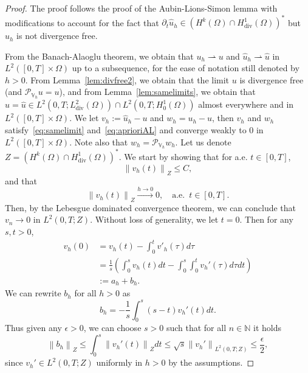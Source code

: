 \documentclass[10pt,a4paper]{amsart}
\newcommand\norm[1]{\left\lVert#1\right\rVert}
\newcommand{\Div}{\operatorname{div}}
\newcommand{\N}{\mathbb{N}}
\newcommand{\PVh}{\mathcal{P}_{\Vh}}
\newcommand{\Vh}{\mathbb{V}_h}
\newcommand{\dom}{\Omega}
\newcommand{\hu}{\widehat{u}}
\newcommand{\weak}{\rightharpoonup}
\begin{document}
\begin{proof}
	The proof follows the proof of the Aubin-Lions-Simon lemma with modifications to account for the fact that $\partial_t \hu_h\in (H^k(\dom)\cap H^1_{\Div}(\dom))^*$ but $\hu_h$ is not divergence free.
	
	From the Banach-Alaoglu theorem, we obtain that $u_h\weak u$ and $\hu_h\weak \hu$ in $L^2([0,T]\times\dom)$ up to a subsequence, for the ease of notation still denoted by $h>0$. From Lemma~\ref{lem:divfree2}, we obtain that the limit $u$ is divergence free (and $\PVh u =u$), and from Lemma~\ref{lem:samelimits}, we obtain that $u=\hu\in L^2(0,T;L^2_{\Div}(\dom))\cap L^2(0,T;H^1_0(\dom))$ almost everywhere and in $L^2([0,T]\times\dom)$. We let $v_h:=\hu_h-u$ and $w_h=u_h-u$, then $v_h$ and $w_h$ satisfy~\eqref{eq:samelimit} and~\eqref{eq:aprioriAL} and converge weakly to $0$ in $L^2([0,T]\times\dom)$. Note also that $w_h = \PVh w_h$.
	Let us denote $Z =  (H^k(\dom)\cap H^1_{\Div}(\dom))^*$. We start by showing that for a.e. $t\in [0,T]$,
		\begin{equation}\label{eq:uniformZ}
		\norm{v_h(t)}_{Z}\leq C,
	\end{equation}
	and that
	\begin{equation}\label{eq:aeliminZ}
		\norm{v_h(t)}_Z \stackrel{h\to 0}{\longrightarrow} 0,\quad \text{a.e. }\, t\in [0,T].
	\end{equation}
	Then, by the Lebesgue dominated convergence theorem, 
	we can conclude that $v_n\to 0$ in $L^2(0,T;Z)$. Without loss of generality, we let $t=0$. Then for any $s,t>0$,
	\begin{equation*}
		\begin{split}
			v_h(0)&= v_h(t)-\int_0^t v'_h(\tau)d\tau\\
			& = \frac{1}{s}\left(\int_0^s v_h(t)dt -\int_0^s \int_0^t v_h'(\tau)d\tau dt\right)\\
			&:= a_h + b_h.	
	\end{split}\end{equation*}
	We can rewrite $b_h$ for all $h>0$ as
	\begin{equation*}
		b_h = -\frac{1}{s}\int_0^s (s-t) v_h'(t)dt.
	\end{equation*}
	Thus given any $\epsilon>0$, we can choose $s>0$ such that for all $n\in\N$ it holds
	\begin{equation*}
		\norm{b_h}_{Z}\leq \int_0^s \norm{v_h'(t)}_{Z} dt\leq \sqrt{s}\norm{v_h'}_{L^2(0,T;Z)} \leq \frac{\epsilon}{2},
	\end{equation*}
	since $v_h'\in L^2(0,T;Z)$ uniformly in $h>0$ by the assumptions.

\end{proof}
\end{document}
